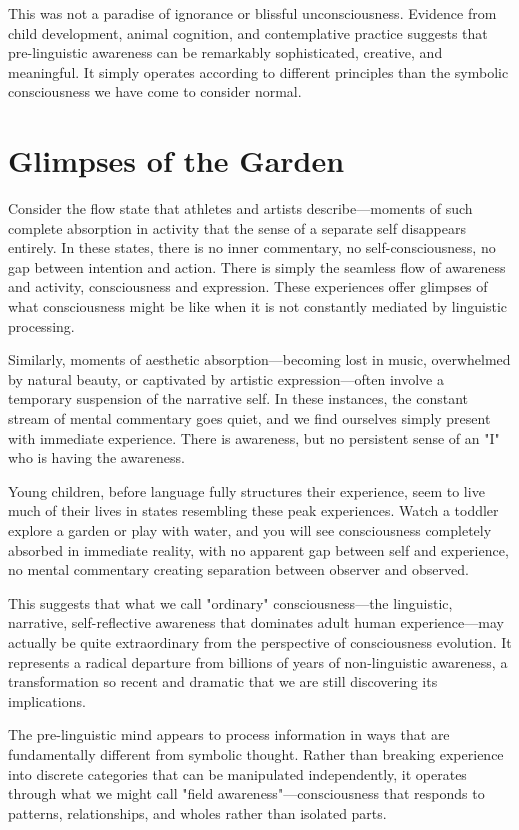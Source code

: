This was not a paradise of ignorance or blissful unconsciousness. Evidence from child development, animal cognition, and contemplative practice suggests that pre-linguistic awareness can be remarkably sophisticated, creative, and meaningful. It simply operates according to different principles than the symbolic consciousness we have come to consider normal.

\section{Glimpses of the Garden}

Consider the flow state that athletes and artists describe—moments of such complete absorption in activity that the sense of a separate self disappears entirely. In these states, there is no inner commentary, no self-consciousness, no gap between intention and action. There is simply the seamless flow of awareness and activity, consciousness and expression. These experiences offer glimpses of what consciousness might be like when it is not constantly mediated by linguistic processing.

Similarly, moments of aesthetic absorption—becoming lost in music, overwhelmed by natural beauty, or captivated by artistic expression—often involve a temporary suspension of the narrative self. In these instances, the constant stream of mental commentary goes quiet, and we find ourselves simply present with immediate experience. There is awareness, but no persistent sense of an "I" who is having the awareness.

Young children, before language fully structures their experience, seem to live much of their lives in states resembling these peak experiences. Watch a toddler explore a garden or play with water, and you will see consciousness completely absorbed in immediate reality, with no apparent gap between self and experience, no mental commentary creating separation between observer and observed.

This suggests that what we call "ordinary" consciousness—the linguistic, narrative, self-reflective awareness that dominates adult human experience—may actually be quite extraordinary from the perspective of consciousness evolution. It represents a radical departure from billions of years of non-linguistic awareness, a transformation so recent and dramatic that we are still discovering its implications.

The pre-linguistic mind appears to process information in ways that are fundamentally different from symbolic thought. Rather than breaking experience into discrete categories that can be manipulated independently, it operates through what we might call "field awareness"—consciousness that responds to patterns, relationships, and wholes rather than isolated parts.


